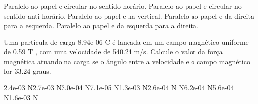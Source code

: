 \documentclass[12pt, addpoints]{exam}
\begin{document}
\begin{questions}
\begin{multicols*}{2}
\begin{choices}
\choice Paralelo ao papel e circular no sentido horário. 
\choice Paralelo ao papel e circular no sentido anti-horário. 
\choice Paralelo ao papel e na vertical. 
\choice Paralelo ao papel e da direita para a esquerda. 
\choice Paralelo ao papel e da esquerda para a direita. 
\end{choices}
\question Uma partícula de carga 8.94e-06 C é lançada em um campo magnético uniforme de    0.59 T , com uma velocidade de 540.24 m/s. Calcule o valor da força magnética atuando na carga se o ângulo entre a velocidade e o campo magnético for   33.24 graus.

\begin{oneparchoices}
\choice 2.4e-03 N\choice 2.7e-03 N\choice 3.0e-04 N\choice 7.1e-05 N\choice 1.3e-03 N\choice 2.6e-04 N N\choice 6.2e-04 N\choice 5.6e-04 N\choice 1.6e-03 N
\end{oneparchoices}\end{multicols*}
\end{questions}
\newpage
\end{document}
